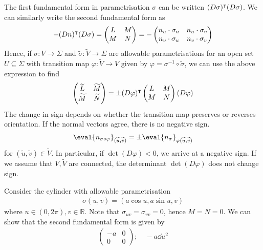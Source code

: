 \begin{remark}
	The first fundamental form in parametrisation $\sigma$ can be written $(D \sigma)^\intercal (D \sigma)$.
	We can similarly write the second fundamental form as
	\begin{align*}
		-(Dn)^\intercal (D\sigma) = \begin{pmatrix}
			L & M \\
			M & N
		\end{pmatrix} = -\begin{pmatrix}
			n_u \cdot \sigma_u & n_u \cdot \sigma_v \\
			n_v \cdot \sigma_u & n_v \cdot \sigma_v
		\end{pmatrix}
	\end{align*}
	Hence, if $\sigma \colon V \to \Sigma$ and $\widetilde \sigma \colon \widetilde V \to \Sigma$ are allowable parametrisations for an open set $U \subseteq \Sigma$ with transition map $\varphi \colon \widetilde V \to V$ given by $\varphi = \sigma^{-1} \circ \widetilde \sigma$, we can use the above expression to find
	\begin{align*}
		\begin{pmatrix}
			\widetilde L & \widetilde M \\
			\widetilde M & \widetilde N
		\end{pmatrix} = \pm (D\varphi)^\intercal \begin{pmatrix}
			L & M \\
			M & N
		\end{pmatrix} (D\varphi)
	\end{align*}
	The change in sign depends on whether the transition map preserves or reverses orientation.
	If the normal vectors agree, there is no negative sign.
	\begin{align*}
		\eval{n_{\sigma \circ \varphi}}_{(\widetilde u, \widetilde v)} = \pm \eval{n_\sigma}_{\varphi(\widetilde u, \widetilde v)}
	\end{align*}
	for $(\widetilde u, \widetilde v) \in \widetilde V$.
	In particular, if $\det (D \varphi) < 0$, we arrive at a negative sign.
	If we assume that $V, \widetilde V$ are connected, the determinant $\det (D \varphi)$ does not change sign.
\end{remark}
\begin{example}
	Consider the cylinder with allowable parametrisation
	\begin{align*}
		\sigma(u,v) = (a \cos u, a \sin u, v)
	\end{align*}
	where $u \in (0,2\pi), v \in \mathbb R$.
	Note that $\sigma_{uv} = \sigma_{vv} = 0$, hence $M = N = 0$.
	We can show that the second fundamental form is given by
	\begin{align*}
		\begin{pmatrix}
			-a & 0 \\
			0  & 0
		\end{pmatrix};\quad -a \dd{u}^2
	\end{align*}
\end{example}

